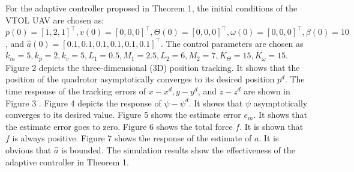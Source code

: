 \documentclass[10pt]{article}
\begin{document}
For the adaptive controller proposed in Theorem 1, the initial conditions of the VTOL UAV are chosen as: $p(0)=[1,2,1]^{\top}, v(0)=[0,0,0]^{\top}, \Theta(0)=[0,0,0]^{\top}, \omega(0)=[0,0,0]^{\top}, \beta(0)=10$, and $\hat{a}(0)=[0.1,0.1,0.1,0.1,0.1,0.1]^{\top}$. The control parameters are chosen as $k_{m}=5, k_{p}=2, k_{v}=5, L_{1}=0.5, M_{1}=2.5, L_{2}=6, M_{2}=7, K_{\Theta}=15, K_{\omega}=15$. Figure 2 depicts the three-dimensional (3D) position tracking. It shows that the position of the quadrotor asymptotically converges to its desired position $p^{d}$. The time response of the tracking errors of $x-x^{d}, y-y^{d}$, and $z-z^{d}$ are shown in Figure 3 . Figure 4 depicts the response of $\psi-\psi^{d}$. It shows that $\psi$ asymptotically converges to its desired value. Figure 5 shows the estimate error $e_{m}$. It shows that the estimate error goes to zero. Figure 6 shows the total force $f$. It is shown that $f$ is always positive. Figure 7 shows the response of the estimate of $a$. It is obvious that $\hat{a}$ is bounded. The simulation results show the effectiveness of the adaptive controller in Theorem 1.
\end{document}
